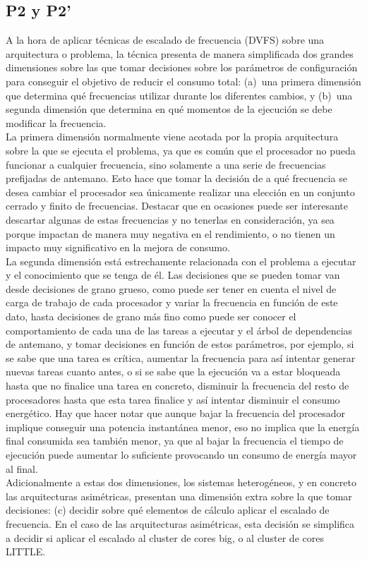 \subsection{P2 y P2'}
A la hora de aplicar técnicas de escalado de frecuencia (DVFS) sobre una
arquitectura o problema, la técnica presenta de manera simplificada dos
grandes dimensiones sobre las que tomar decisiones sobre los parámetros de
configuración para conseguir el objetivo de reducir el consumo total:
(a)~una primera dimensión que determina qué frecuencias utilizar durante
los diferentes cambios, y (b)~una segunda dimensión que determina en qué
momentos de la ejecución se debe modificar la frecuencia.\\
La primera dimensión normalmente viene acotada por la propia arquitectura
sobre la que se ejecuta el problema, ya que es común que el procesador no
pueda funcionar a cualquier frecuencia, sino solamente a una serie de
frecuencias prefijadas de antemano. Esto hace que tomar la decisión de a
qué frecuencia se desea cambiar el procesador sea únicamente realizar una
elección en un conjunto cerrado y finito de frecuencias. Destacar que en
ocasiones puede ser interesante descartar algunas de estas frecuencias y no
tenerlas en consideración, ya sea porque impactan de manera muy negativa en
el rendimiento, o no tienen un impacto muy significativo en la mejora de
consumo.\\
La segunda dimensión está estrechamente relacionada con el problema a
ejecutar y el conocimiento que se tenga de él. Las decisiones que se pueden
tomar van desde decisiones de grano grueso, como puede ser tener en cuenta
el nivel de carga de trabajo de cada procesador y variar la frecuencia en
función de este dato, hasta decisiones de grano más fino como puede ser
conocer el comportamiento de cada una de las tareas a ejecutar y el árbol
de dependencias de antemano, y tomar decisiones en función de estos
parámetros, por ejemplo, si se sabe que una tarea es crítica, aumentar la
frecuencia para así intentar generar nuevas tareas cuanto antes, o si se
sabe que la ejecución va a estar bloqueada hasta que no finalice una tarea
en concreto, disminuir la frecuencia del resto de procesadores hasta que
esta tarea finalice y así intentar disminuir el consumo energético. Hay que
hacer notar que aunque bajar la frecuencia del procesador implique
conseguir una potencia instantánea menor, eso no implica que la energía
final consumida sea también menor, ya que al bajar la frecuencia el tiempo
de ejecución puede aumentar lo suficiente provocando un consumo de energía
mayor al final.\\
Adicionalmente a estas dos dimensiones, los sistemas heterogéneos, y en
concreto las arquitecturas asimétricas, presentan una dimensión extra sobre
la que tomar decisiones: (c) decidir sobre qué elementos de cálculo aplicar
el escalado de frecuencia. En el caso de las arquitecturas asimétricas,
esta decisión se simplifica a decidir si aplicar el escalado al cluster de
cores big, o al cluster de cores LITTLE.\\

